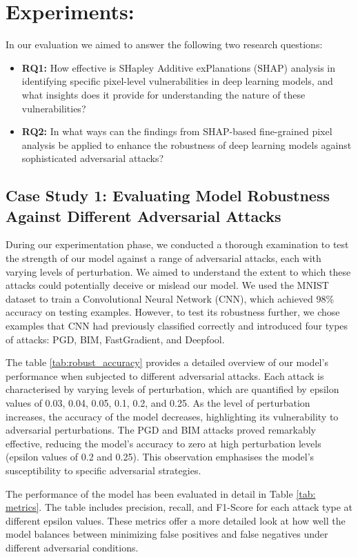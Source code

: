 \documentclass[10pt, conference, a4paper, final]{IEEEtran}
\begin{document}
\section{Experiments:}

In our evaluation we aimed to answer the following two research questions:
\begin{itemize}
    \item\textbf{RQ1:} How effective is SHapley Additive exPlanations (SHAP) analysis in identifying specific pixel-level vulnerabilities in deep learning models, and what insights does it provide for understanding the nature of these vulnerabilities?
    \item\textbf{RQ2:} In what ways can the findings from SHAP-based fine-grained pixel analysis be applied to enhance the robustness of deep learning models against sophisticated adversarial attacks?
\end{itemize}
\subsection{Case Study 1: Evaluating Model Robustness Against Different Adversarial Attacks}

During our experimentation phase, we conducted a thorough examination to test the strength of our model against a range of adversarial attacks, each with varying levels of perturbation. We aimed to understand the extent to which these attacks could potentially deceive or mislead our model. We used the MNIST dataset to train a Convolutional Neural Network (CNN), which achieved 98\% accuracy on testing examples. However, to test its robustness further, we chose examples that CNN had previously classified correctly and introduced four types of attacks: PGD, BIM, FastGradient, and Deepfool.

The table \ref{tab:robust_accuracy} provides a detailed overview of our model's performance when subjected to different adversarial attacks. Each attack is characterised by varying levels of perturbation, which are quantified by epsilon values of 0.03, 0.04, 0.05, 0.1, 0.2, and 0.25. As the level of perturbation increases, the accuracy of the model decreases, highlighting its vulnerability to adversarial perturbations. The PGD and BIM attacks proved remarkably effective, reducing the model's accuracy to zero at high perturbation levels (epsilon values of 0.2 and 0.25). This observation emphasises the model's susceptibility to specific adversarial strategies.

The performance of the model has been evaluated in detail in Table \ref{tab: metrics}. The table includes precision, recall, and F1-Score for each attack type at different epsilon values. These metrics offer a more detailed look at how well the model balances between minimizing false positives and false negatives under different adversarial conditions.
\end{document}
